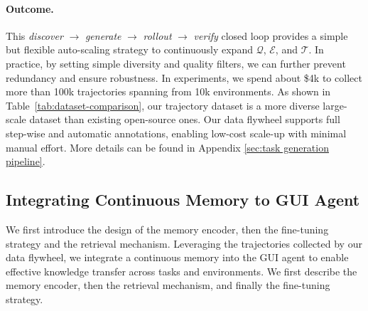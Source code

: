 \documentclass{article} %
\begin{document}
\paragraph{Outcome.}
This \emph{discover} $\rightarrow$ \emph{generate} $\rightarrow$ \emph{rollout} $\rightarrow$ \emph{verify} closed loop provides a simple but flexible auto-scaling strategy to continuously expand $\mathcal{Q}$, $\mathcal{E}$, and $\mathcal{T}$. 
In practice, by setting simple diversity and quality filters, we can further prevent redundancy and ensure robustness.
In experiments, we spend about \$4k to collect more than 100k trajectories spanning from 10k environments.
As shown in Table~\ref{tab:dataset-comparison}, our trajectory dataset is a more diverse large-scale dataset than existing open-source ones. Our data flywheel supports full step-wise and automatic annotations, enabling low-cost scale-up with minimal manual effort. More details can be found in Appendix \ref{sec:task generation pipeline}.

\subsection{Integrating Continuous Memory to GUI Agent}
\label{sec:memory design}
We first introduce the design of the memory encoder, then the fine-tuning strategy and the retrieval mechanism.
Leveraging the trajectories collected by our data flywheel, we integrate a continuous memory into the GUI agent to enable effective knowledge transfer across tasks and environments. We first describe the memory encoder, then the retrieval mechanism, and finally the fine-tuning strategy.

\end{document}
